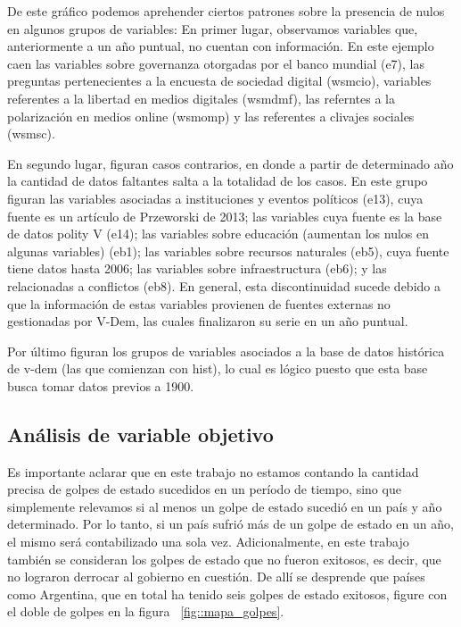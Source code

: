 \documentclass{article}
\begin{document}
De este gráfico podemos aprehender ciertos patrones sobre la presencia de nulos
en algunos grupos de variables: En primer lugar, observamos variables que,
anteriormente a un año puntual, no cuentan con información. En este ejemplo caen
las variables sobre governanza otorgadas por el banco mundial (e7), las preguntas
pertenecientes a la encuesta de sociedad digital (wsmcio), variables referentes a
la libertad en medios digitales (wsmdmf), las referntes a la polarización en medios
online (wsmomp) y las referentes a clivajes sociales (wsmsc).

En segundo lugar, figuran casos contrarios, en donde a partir de determinado año
la cantidad de datos faltantes salta a la totalidad de los casos. En este grupo
figuran las variables asociadas a instituciones y eventos políticos (e13), cuya 
fuente es un artículo de Przeworski de 2013; las variables cuya fuente es la base
de datos polity V (e14); las variables sobre educación (aumentan los nulos en 
algunas variables) (eb1); las variables sobre recursos naturales (eb5), cuya fuente 
tiene datos hasta 2006; las variables sobre infraestructura (eb6); y las relacionadas 
a conflictos (eb8). En general, esta discontinuidad sucede debido a que la 
información de estas variables provienen de fuentes externas no gestionadas por 
V-Dem, las cuales finalizaron su serie en un año puntual.

Por último figuran los grupos de variables asociados a la base de datos histórica
de v-dem (las que comienzan con hist), lo cual es lógico puesto que esta base busca
tomar datos previos a 1900.

\subsection{Análisis de variable objetivo}

Es importante aclarar que en este trabajo no estamos contando la cantidad precisa
de golpes de estado sucedidos en un período de tiempo, sino que simplemente relevamos
si al menos un golpe de estado sucedió en un país y año determinado. Por lo tanto, si
un país sufrió más de un golpe de estado en un año, el mismo será contabilizado una
sola vez. Adicionalmente, en este trabajo también se consideran los golpes de estado
que no fueron exitosos, es decir, que no lograron derrocar al gobierno en cuestión. 
De allí se desprende que países como Argentina, que en total ha tenido seis golpes de 
estado exitosos, figure con el doble de golpes en la figura ~\ref{fig::mapa_golpes}.
\end{document}
